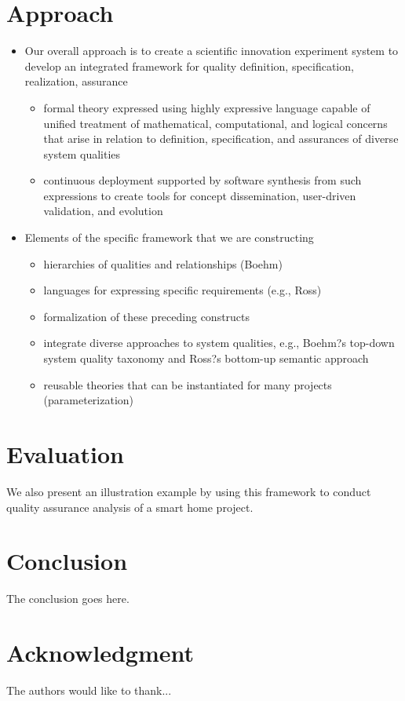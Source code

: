 \documentclass[conference]{IEEEtran}
\begin{document}
\section{Approach}
\begin{itemize}
	\item	Our overall approach is to create a scientific innovation experiment system to develop an integrated framework for quality definition, specification, realization, assurance 
	\begin{itemize}
		\item	formal theory expressed using highly expressive language capable of unified treatment of mathematical, computational, and logical concerns that arise in relation to definition, specification, and assurances of diverse system qualities
		\item	continuous deployment supported by software synthesis from such expressions to create tools for concept dissemination, user-driven validation, and evolution
	\end{itemize}
	\item	Elements of the specific framework that we are constructing
	\begin{itemize}
		\item	hierarchies of qualities and relationships (Boehm)
		\item	languages for expressing specific requirements (e.g., Ross)
		\item	formalization of these preceding constructs 
		\item	integrate diverse approaches to system qualities, e.g., Boehm?s top-down system quality taxonomy and Ross?s bottom-up semantic approach
		\item	reusable theories that can be instantiated for many projects (parameterization)
	\end{itemize}
\end{itemize}

\section{Evaluation}
We also present an illustration example by using this framework to conduct quality assurance analysis of a smart home project.

\section{Conclusion}
The conclusion goes here.


\section*{Acknowledgment}
The authors would like to thank...

{}


\end{document}

